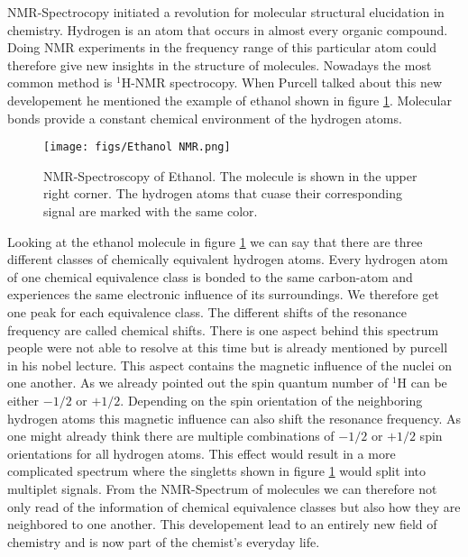 \documentclass{article}
\begin{document}
NMR-Spectrocopy initiated a revolution for molecular structural elucidation in chemistry. Hydrogen is an atom that occurs in almost every organic compound. Doing NMR experiments in the frequency range of this particular atom could therefore give new insights in the structure of molecules. Nowadays the most common method is $^1\mathrm{H}$-NMR spectrocopy. When Purcell talked about this new developement he mentioned the example of ethanol shown in figure \ref{fig:Ethanol NMR}. Molecular bonds provide a constant chemical environment of the hydrogen atoms.

\begin{figure}[h]
    \centering
    \texttt{[image: figs/Ethanol NMR.png]}
    \caption{NMR-Spectroscopy of Ethanol. The molecule is shown in the upper right corner. The hydrogen atoms that cuase their corresponding signal are marked with the same color.}
    \label{fig:Ethanol NMR}
\end{figure}
Looking at the ethanol molecule in figure \ref{fig:Ethanol NMR} we can say that there are three different classes of chemically equivalent hydrogen atoms. Every hydrogen atom of one chemical equivalence class is bonded to the same carbon-atom and experiences the same electronic influence of its surroundings. We therefore get one peak for each equivalence class. The different shifts of the resonance frequency are called chemical shifts. There is one aspect behind this spectrum people were not able to resolve at this time but is already mentioned by purcell in his nobel lecture. This aspect contains the magnetic influence of the nuclei on one another. As we already pointed out the spin quantum number of $^1\mathrm{H}$ can be either $-1/2$ or $+1/2$. Depending on the spin orientation of the neighboring hydrogen atoms this magnetic influence can also shift the resonance frequency. As one might already think there are multiple combinations of $-1/2$ or $+1/2$ spin orientations for all hydrogen atoms. This effect would result in a more complicated spectrum where the singletts shown in figure \ref{fig:Ethanol NMR} would split into multiplet signals. From the NMR-Spectrum of molecules we can therefore not only read of the information of chemical equivalence classes but also how they are neighbored to one another. This developement lead to an entirely new field of chemistry and is now part of the chemist's everyday life.
\end{document}
